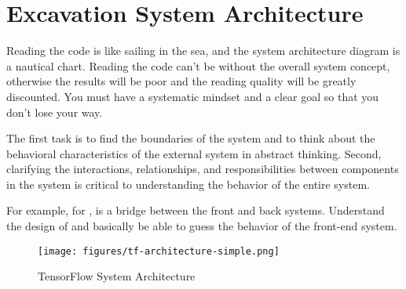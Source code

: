 \section{Excavation System Architecture}
\begin{content}
Reading the code is like sailing in the sea, and the system architecture diagram is a nautical chart. Reading the code can't be without the overall system concept, otherwise the results will be poor and the reading quality will be greatly discounted. You must have a systematic mindset and a clear goal so that you don't lose your way.

The first task is to find the boundaries of the system and to think about the behavioral characteristics of the external system in abstract thinking. Second, clarifying the interactions, relationships, and responsibilities between components in the system is critical to understanding the behavior of the entire system.

For example, for ,  is a bridge between the front and back systems. Understand the design of  and basically be able to guess the behavior of the front-end system.

\begin{figure}[!h]
  \centering
  \texttt{[image: figures/tf-architecture-simple.png]}
  \caption{TensorFlow System Architecture}
  \label{fig:tf-architecture-simple}
\end{figure}
\end{content}


